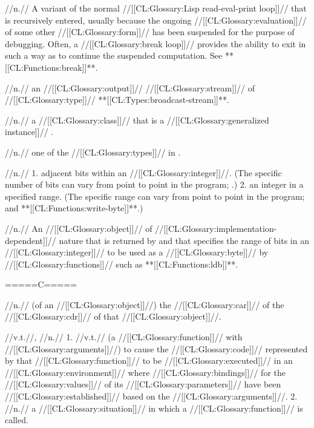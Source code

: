  //n.// A variant of the normal //[[CL:Glossary:Lisp read-eval-print loop]]// that is recursively entered, usually because the ongoing //[[CL:Glossary:evaluation]]// of some other //[[CL:Glossary:form]]// has been suspended for the purpose of debugging. Often, a //[[CL:Glossary:break loop]]// provides the ability to exit in such a way as to continue the suspended computation. See **[[CL:Functions:break]]**.

 //n.// an //[[CL:Glossary:output]]// //[[CL:Glossary:stream]]// of //[[CL:Glossary:type]]// **[[CL:Types:broadcast-stream]]**.

 //n.// a //[[CL:Glossary:class]]// that is a //[[CL:Glossary:generalized instance]]// .

 //n.// one of the //[[CL:Glossary:types]]// in \figref\StandardizedAtomicTypeSpecs.


 //n.// 1. adjacent bits within an //[[CL:Glossary:integer]]//. (The specific number of bits can vary from point to point in the program; .) 2. an integer in a specified range. (The specific range can vary from point to point in the program;  and **[[CL:Functions:write-byte]]**.)

 //n.// An //[[CL:Glossary:object]]// of //[[CL:Glossary:implementation-dependent]]// nature that is returned by  and that specifies the range of bits in an //[[CL:Glossary:integer]]// to be used as a //[[CL:Glossary:byte]]// by //[[CL:Glossary:functions]]// such as **[[CL:Functions:ldb]]**.

=====C=====

 //n.// (of an //[[CL:Glossary:object]]//) the //[[CL:Glossary:car]]// of the //[[CL:Glossary:cdr]]// of that //[[CL:Glossary:object]]//.

 //v.t.//, //n.// 1. //v.t.// (a //[[CL:Glossary:function]]// with //[[CL:Glossary:arguments]]//) to cause the //[[CL:Glossary:code]]// represented by that //[[CL:Glossary:function]]// to be //[[CL:Glossary:executed]]// in an //[[CL:Glossary:environment]]// where //[[CL:Glossary:bindings]]// for the //[[CL:Glossary:values]]// of its //[[CL:Glossary:parameters]]// have been //[[CL:Glossary:established]]// based on the //[[CL:Glossary:arguments]]//.  2. //n.// a //[[CL:Glossary:situation]]// in which a //[[CL:Glossary:function]]// is called.

